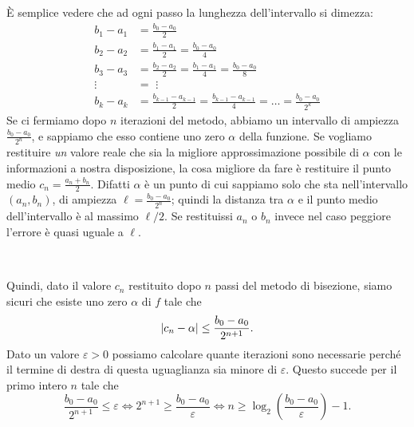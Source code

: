 \documentclass[a4paper]{report}
\DeclarePairedDelimiter{\abs}{\lvert}{\rvert}
\theoremstyle{definiton}
\theoremstyle{remark}
\begin{document}
È semplice vedere che ad ogni passo la lunghezza dell'intervallo si dimezza:
\begin{align*}
    b_1 - a_1 &= \frac{b_0-a_0}{2}\\
    b_2 - a_2 &= \frac{b_1-a_1}{2} = \frac{b_0-a_0}{4}\\
    b_3 - a_3 &= \frac{b_2-a_2}{2} = \frac{b_1-a_1}{4} = \frac{b_0-a_0}{8}\\
    \vdots \,\,&= \,\,\vdots\\
    b_{k} - a_{k} &= \frac{b_{k-1} - a_{k-1}}{2} = \frac{b_{k-1} - a_{k-1}}{4} = \dots = \frac{b_{0} - a_{0}}{2^k}
\end{align*}
Se ci fermiamo dopo $n$ iterazioni del metodo, abbiamo un intervallo di ampiezza $\frac{b_0-a_0}{2^{n}}$, e sappiamo che esso contiene uno zero $\alpha$ della funzione. Se vogliamo restituire \emph{un} valore reale che sia la migliore approssimazione possibile di $\alpha$ con le informazioni a nostra disposizione, la cosa migliore da fare è restituire il punto medio $c_n = \frac{a_n + b_n}{2}$. Difatti $\alpha$ è un punto di cui sappiamo solo che sta nell'intervallo $(a_n,b_n)$, di ampiezza $\ell = \frac{b_0-a_0}{2^{n}}$; quindi la distanza tra $\alpha$ e il punto medio dell'intervallo è al massimo $\ell/2$. Se restituissi $a_n$ o $b_n$ invece nel caso peggiore l'errore è quasi uguale a $\ell$.
\begin{center}
    \\
\end{center}
Quindi, dato il valore $c_n$ restituito dopo $n$ passi del metodo di bisezione, siamo sicuri che esiste uno zero $\alpha$ di $f$ tale che 
\[
\abs{c_n - \alpha} \leq \frac{b_0-a_0}{2^{n+1}}.
\]
Dato un valore $\varepsilon > 0$ possiamo calcolare quante iterazioni sono necessarie perché il termine di destra di questa uguaglianza sia minore di $\varepsilon$. Questo succede per il primo intero $n$ tale che
\[
\frac{b_0 - a_0}{2^{n+1}} \leq \varepsilon \iff 2^{n+1} \geq \frac{b_0 - a_0}{\varepsilon} \iff n \geq \log_2 \left(\frac{b_0 - a_0}{\varepsilon}\right)-1.
\]
\end{document}
